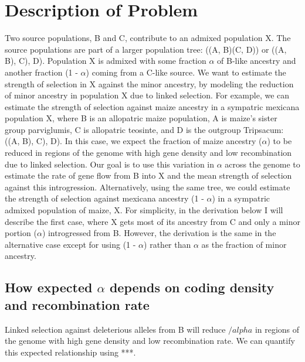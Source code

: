 \documentclass[12pt]{report}
\begin{document}
\section{Description of Problem}
Two source populations, B and C, contribute to an admixed population X. The source populations are part of a larger population tree: ((A, B)(C, D)) or ((A, B), C), D). Population X is admixed with some fraction $\alpha$ of B-like ancestry and another fraction (1 - $\alpha$) coming from a C-like source. We want to estimate the strength of selection in X against the minor ancestry, by modeling the reduction of minor ancestry in population X due to linked selection. For example, we can estimate the strength of selection against maize ancestry in a sympatric mexicana population X, where B is an allopatric maize population, A is maize's sister group parviglumis, C is allopatric teosinte, and D is the outgroup Tripsacum: ((A, B), C), D). In this case, we expect the fraction of maize ancestry ($\alpha$) to be reduced in regions of the genome with high gene density and low recombination due to linked selection. Our goal is to use this variation in $\alpha$ across the genome to estimate the rate of gene flow from B into X and the mean strength of selection against this introgression. Alternatively, using the same tree, we could estimate the strength of selection against mexicana ancestry (1 - $\alpha$) in a sympatric admixed population of maize, X. For simplicity, in the derivation below I will describe the first case, where X gets most of its ancestry from C and only a minor portion ($\alpha$) introgressed from B. However, the derivation is the same in the alternative case except for using (1 - $\alpha$) rather than $\alpha$ as the fraction of minor ancestry.\par

\subsection{How expected $\alpha$ depends on coding density and recombination rate}
Linked selection against deleterious alleles from B will reduce $/alpha$ in regions of the genome with high gene density and low recombination rate. We can quantify this expected relationship using ***.\par
\end{document}
